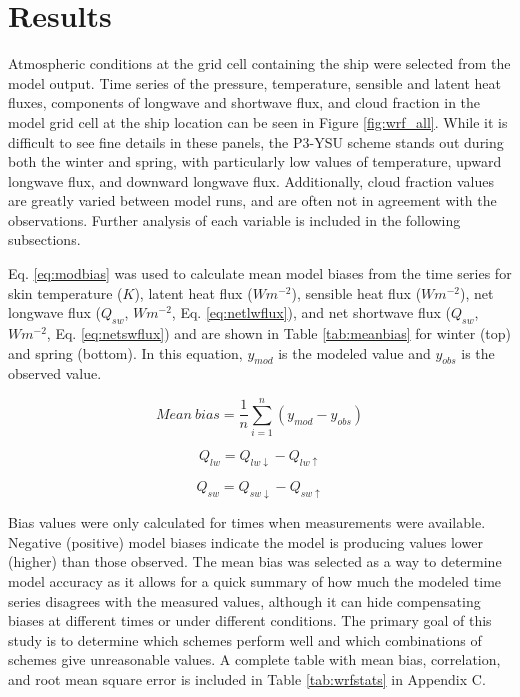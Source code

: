 \section{Results}
Atmospheric conditions at the grid cell containing the ship were selected from the model output. Time series of the pressure, temperature, sensible and latent heat fluxes, components of longwave and shortwave flux, and cloud fraction in the model grid cell at the ship location can be seen in Figure \ref{fig:wrf_all}. While it is difficult to see fine details in these panels, the P3-YSU scheme stands out during both the winter and spring, with particularly low values of temperature, upward longwave flux, and downward longwave flux. Additionally, cloud fraction values are greatly varied between model runs, and are often not in agreement with the observations. Further analysis of each variable is included in the following subsections.

Eq. \ref{eq:modbias} was used to calculate mean model biases from the time series for skin temperature ($K$), latent heat flux ($Wm^{-2}$), sensible heat flux ($Wm^{-2}$), net longwave flux ($Q_{sw}$, $Wm^{-2}$, Eq. \ref{eq:netlwflux}), and net shortwave flux ($Q_{sw}$, $Wm^{-2}$, Eq. \ref{eq:netswflux}) and are shown in Table \ref{tab:meanbias} for winter (top) and spring (bottom). In this equation, $y_{mod}$ is the modeled value and $y_{obs}$ is the observed value.
 
\begin{equation}\label{eq:modbias}
Mean~bias = \frac{1}{n}\sum^{n}_{i=1}(y_{mod} - y_{obs})
\end{equation}

\begin{equation}\label{eq:netlwflux}
Q_{lw} = Q_{lw \downarrow} - Q_{lw \uparrow}
\end{equation}

\begin{equation}\label{eq:netswflux}
Q_{sw} = Q_{sw \downarrow} - Q_{sw \uparrow}
\end{equation}

 Bias values were only calculated for times when measurements were available. Negative (positive) model biases indicate the model is producing values lower (higher) than those observed. The mean bias was selected as a way to determine model accuracy as it allows for a quick summary of how much the modeled time series disagrees with the measured values, although it can hide compensating biases at different times or under different conditions. The primary goal of this study is to determine which schemes perform well and which combinations of schemes give unreasonable values. A complete table with mean bias, correlation, and root mean square error is included in Table \ref{tab:wrfstats} in Appendix C. 

